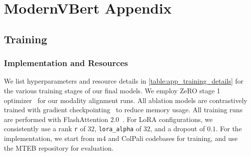 \chapter{ModernVBert Appendix}


\section{Training}

\subsection{Implementation and Resources}
\label{appendix:implementation_details}

We list hyperparameters and resource details in \autoref{table:app_training_details} for the various training stages of our final models. We employ ZeRO stage 1 optimizer~ for our modality alignment runs. All ablation models are contrastively trained with gradient checkpointing~ to reduce memory usage. All training runs are performed with FlashAttention 2.0~. For LoRA configurations, we consistently use a rank \texttt{r} of $32$, \texttt{lora\_alpha} of $32$, and a dropout of $0.1$. For the implementation, we start from m4 and ColPali codebases for training, and use the MTEB repository for evaluation.\sidenote{\ghrepo}

